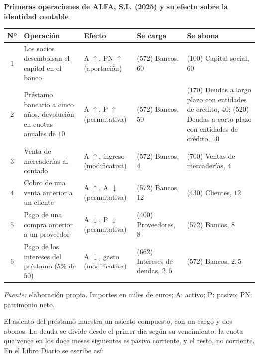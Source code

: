 \documentclass[10pt,a4paper]{article}
\begin{document}
\begin{center}\begin{minipage}{\linewidth}\centering
{\small\textbf{Primeras operaciones de ALFA, S.L. (2025) y su efecto sobre la identidad contable}}\par\vspace{0.3em}
{\small
\begin{tabular}{c p{3.6cm} p{2.4cm} p{3.6cm} p{3.6cm}}
\hline
\textbf{Nº} & \textbf{Operación} & \textbf{Efecto} & \textbf{Se carga} & \textbf{Se abona} \\
\hline
$1$ & \raggedright Los socios desembolsan el capital en el banco & \raggedright A $\uparrow$, PN $\uparrow$ (aportación) & \raggedright (572) Bancos, $60$ & \raggedright (100) Capital social, $60$ \tabularnewline
$2$ & \raggedright Préstamo bancario a cinco años, devolución en cuotas anuales de $10$ & \raggedright A $\uparrow$, P $\uparrow$ (permutativa) & \raggedright (572) Bancos, $50$ & \raggedright (170) Deudas a largo plazo con entidades de crédito, $40$; (520) Deudas a corto plazo con entidades de crédito, $10$ \tabularnewline
$3$ & \raggedright Venta de mercaderías al contado & \raggedright A $\uparrow$, ingreso (modificativa) & \raggedright (572) Bancos, $4$ & \raggedright (700) Ventas de mercaderías, $4$ \tabularnewline
$4$ & \raggedright Cobro de una venta anterior a un cliente & \raggedright A $\uparrow$, A $\downarrow$ (permutativa) & \raggedright (572) Bancos, $12$ & \raggedright (430) Clientes, $12$ \tabularnewline
$5$ & \raggedright Pago de una compra anterior a un proveedor & \raggedright A $\downarrow$, P $\downarrow$ (permutativa) & \raggedright (400) Proveedores, $8$ & \raggedright (572) Bancos, $8$ \tabularnewline
$6$ & \raggedright Pago de los intereses del préstamo ($5\%$ de $50$) & \raggedright A $\downarrow$, gasto (modificativa) & \raggedright (662) Intereses de deudas, $2,5$ & \raggedright (572) Bancos, $2,5$ \tabularnewline
\hline
\end{tabular}}\par\vspace{0.3em}
{\small\textit{Fuente: }elaboración propia. Importes en miles de euros; A: activo; P: pasivo; PN: patrimonio neto.}
\end{minipage}\end{center}

El asiento del préstamo muestra un asiento compuesto, con un cargo y dos abonos. La deuda se divide desde el primer día según su vencimiento: la cuota que vence en los doce meses siguientes es pasivo corriente, y el resto, no corriente. En el Libro Diario se escribe así:
\end{document}
